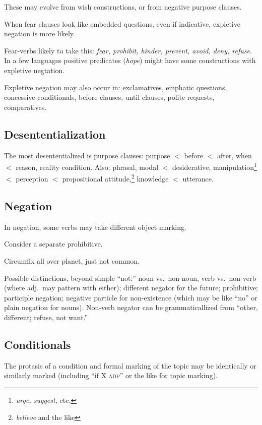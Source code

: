 \documentclass[11pt]{article}
\newcommand{\E}[1]{\textit{#1}}   %
\newcommand{\I}[1]{\textsc{#1}}   %
\begin{document}
These may evolve from wish constructions, or from negative
purpose clauses.

When fear clauses look like embedded questions, even if indicative,
expletive negation is more likely.

Fear-verbs likely to take this: \E{fear, prohibit, hinder, prevent,
  avoid, deny, refuse}.  In a few languages positive predicates
(\E{hope}) might have some constructions with expletive negtation.

Expletive negation may also occur in: exclamatives, emphatic
questions, concessive conditionals, before clauses, until clauses,
polite requests, comparatives.


\subsection{Desententialization}
The most desententialized is purpose clauses: purpose $<$ before $<$
after, when $<$ reason, reality condition.  Also: phrasal, modal $<$
desiderative, manipulation\footnote{\textit{urge, suggest,} etc.} $<$
perception $<$ propositional attitude,\footnote{\textit{believe} and
the like} knowledge $<$ utterance.



\subsection{Negation}
In negation, some verbs may take different object marking.

Consider a separate prohibitive.

Circumfix all over planet, just not common.

Possible distinctions, beyond simple ``not:'' noun vs.\ non-noun, verb
vs.\ non-verb (where adj.\ may pattern with either); different negator
for the future; prohibitive; participle negation; negative particle
for non-existence (which may be like ``no'' or plain negation for
nouns).  Non-verb negator can be grammaticallized from ``other,
different; refuse, not want.''


\subsection{Conditionals}
The protasis of a condition and formal marking of the topic may be
identically or similarly marked (including ``if X \I{adp}'' or the
like for topic marking).
\end{document}
